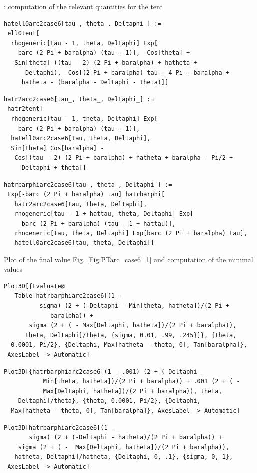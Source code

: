 \documentclass[reqno]{amsart}
\theoremstyle{definition} \newtheorem{definition}{Definition}[section]
\theoremstyle{definition} \newtheorem{remark}[definition]{Remark}
\theoremstyle{plain} \newtheorem{lemma}[definition]{Lemma}
\theoremstyle{plain} \newtheorem{proposition}[definition]{Proposition}
\theoremstyle{plain} \newtheorem{theorem}[definition]{Theorem}
\theoremstyle{plain} \newtheorem{corollary}[definition]{Corollary}
\theoremstyle{definition} \newtheorem{example}[definition]{Example}
\theoremstyle{plain} \newtheorem{claim}[clai]{Claim}
\theoremstyle{definition} \newtheorem{assumption}[definition]{Assumption}
\theoremstyle{definition} \newtheorem{observation}[definition]{Observation}
\newcommand{\1}{\mathbbm 1}
\newcommand{\smed}{\medskip}
\newcommand{\sbig}{\bigskip}
\numberwithin{equation}{section} %
\theoremstyle{plain} \newtheorem*{theorem*}{Theorem}
\theoremstyle{plain} \newtheorem{mthm}[maintheorem]{Main Theorem}
\theoremstyle{plain} \newtheorem*{mthm*}{Main Theorem}
\theoremstyle{plain} \newtheorem*{conjecture*}{Conjecture}
\theoremstyle{plain} \newtheorem{conjecture}[definition]{Conjecture}
\theoremstyle{plain} \newtheorem*{problem*}{Problem}
\begin{document}
\sbig

: computation of the relevant quantities for the tent
\smed
\begin{verbatim}
hatell0arc2case6[tau_, theta_, Deltaphi_] := 
 ell0tent[
  rhogeneric[tau - 1, theta, Deltaphi] Exp[
    barc (2 Pi + baralpha) (tau - 1)], -Cos[theta] + 
   Sin[theta] ((tau - 2) (2 Pi + baralpha) + hatheta + 
      Deltaphi), -Cos[(2 Pi + baralpha) tau - 4 Pi - baralpha + 
     hatheta - (baralpha - Deltaphi - theta)]]
\end{verbatim}
\begin{verbatim}
hatr2arc2case6[tau_, theta_, Deltaphi_] := 
 hatr2tent[
  rhogeneric[tau - 1, theta, Deltaphi] Exp[
    barc (2 Pi + baralpha) (tau - 1)], 
  hatell0arc2case6[tau, theta, Deltaphi], 
  Sin[theta] Cos[baralpha] - 
   Cos[(tau - 2) (2 Pi + baralpha) + hatheta + baralpha - Pi/2 + 
     Deltaphi + theta]]
\end{verbatim}
\begin{verbatim}
hatrbarphiarc2case6[tau_, theta_, Deltaphi_] := 
 Exp[-barc (2 Pi + baralpha) tau] hatrbarphi[
   hatr2arc2case6[tau, theta, Deltaphi], 
   rhogeneric[tau - 1 + hattau, theta, Deltaphi] Exp[
     barc (2 Pi + baralpha) (tau - 1 + hattau)], 
   rhogeneric[tau, theta, Deltaphi] Exp[barc (2 Pi + baralpha) tau], 
   hatell0arc2case6[tau, theta, Deltaphi]]
\end{verbatim}
\smed
Plot of the final value Fig. \ref{Fig:PTarc_case6_1} and computation of the minimal values
\smed
\begin{verbatim}
Plot3D[{Evaluate@
   Table[hatrbarphiarc2case6[(1 - 
          sigma) (2 + (-Deltaphi - Min[theta, hatheta])/(2 Pi + 
             baralpha)) + 
       sigma (2 + ( - Max[Deltaphi, hatheta])/(2 Pi + baralpha)), 
      theta, Deltaphi]/theta, {sigma, 0.01, .99, .245}]}, {theta, 
  0.0001, Pi/2}, {Deltaphi, Max[hatheta - theta, 0], Tan[baralpha]}, 
 AxesLabel -> Automatic]
\end{verbatim}
\begin{verbatim}
Plot3D[{hatrbarphiarc2case6[(1 - .001) (2 + (-Deltaphi - 
           Min[theta, hatheta])/(2 Pi + baralpha)) + .001 (2 + ( - 
           Max[Deltaphi, hatheta])/(2 Pi + baralpha)), theta, 
    Deltaphi]/theta}, {theta, 0.0001, Pi/2}, {Deltaphi, 
  Max[hatheta - theta, 0], Tan[baralpha]}, AxesLabel -> Automatic]
\end{verbatim}
\begin{verbatim}
Plot3D[hatrbarphiarc2case6[(1 - 
       sigma) (2 + (-Deltaphi - hatheta)/(2 Pi + baralpha)) + 
    sigma (2 + ( -  Max[Deltaphi, hatheta])/(2 Pi + baralpha)), 
   hatheta, Deltaphi]/hatheta, {Deltaphi, 0, .1}, {sigma, 0, 1}, 
 AxesLabel -> Automatic]
\end{verbatim}
\end{document}
